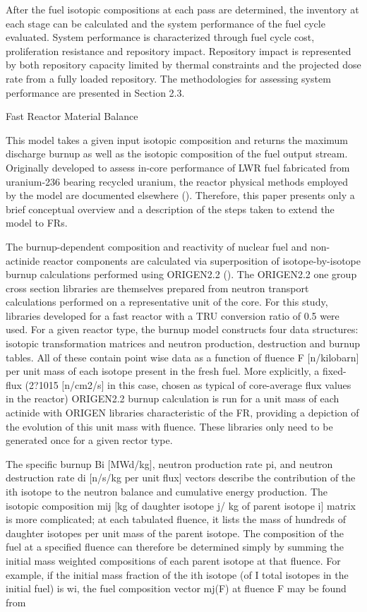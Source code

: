 	After the fuel isotopic compositions at each pass are determined, the
inventory at each stage can be calculated and the system performance of
the fuel cycle evaluated.  System performance is characterized through
fuel cycle cost, proliferation resistance and repository impact. 
Repository impact is represented by both repository capacity limited by
thermal constraints and the projected dose rate from a fully loaded
repository.  The methodologies for assessing system performance are
presented in Section 2.3.

Fast Reactor Material Balance

	This model takes a given input isotopic composition and returns the
maximum discharge burnup as well as the isotopic composition of the fuel
output stream.  Originally developed to assess in-core performance of
LWR fuel fabricated from uranium-236 bearing recycled uranium, the
reactor physical methods employed by the model are documented elsewhere
().  Therefore, this paper presents only a brief conceptual overview and
a description of the steps taken to extend the model to FRs.

	The burnup-dependent composition and reactivity of nuclear fuel and
non-actinide reactor components are calculated via superposition of
isotope-by-isotope burnup calculations performed using ORIGEN2.2 (). 
The ORIGEN2.2 one group cross section libraries are themselves prepared
from neutron transport calculations performed on a representative unit
of the core.  For this study, libraries developed for a fast reactor
with a TRU conversion ratio of 0.5 were used.  For a given reactor type,
the burnup model constructs four data structures: isotopic
transformation matrices and neutron production, destruction and burnup
tables.  All of these contain point wise data as a function of fluence F
$[$n/kilobarn$]$ per unit mass of each isotope present in the fresh
fuel.  More explicitly, a fixed-flux (2?1015 $[$n/cm2/s$]$ in this case,
chosen as typical of core-average flux values in the reactor) ORIGEN2.2
burnup calculation is run for a unit mass of each actinide with ORIGEN
libraries characteristic of the FR, providing a depiction of the
evolution of this unit mass with fluence.   These libraries only need to
be generated once for a given rector type.  

	The specific burnup Bi $[$MWd/kg$]$, neutron production rate pi, and
neutron destruction rate di $[$n/s/kg per unit flux$]$ vectors describe
the contribution of the ith isotope to the neutron balance and
cumulative energy production.  The isotopic composition mij $[$kg of
daughter isotope j/ kg of parent isotope i$]$ matrix is more
complicated; at each tabulated fluence, it lists the mass of hundreds of
daughter isotopes per unit mass of the parent isotope.  The composition
of the fuel at a specified fluence can therefore be determined simply by
summing the initial mass weighted compositions of each parent isotope at
that fluence.  For example, if the initial mass fraction of the ith
isotope (of I total isotopes in the initial fuel) is wi, the fuel
composition vector mj(F) at fluence F may be found from

